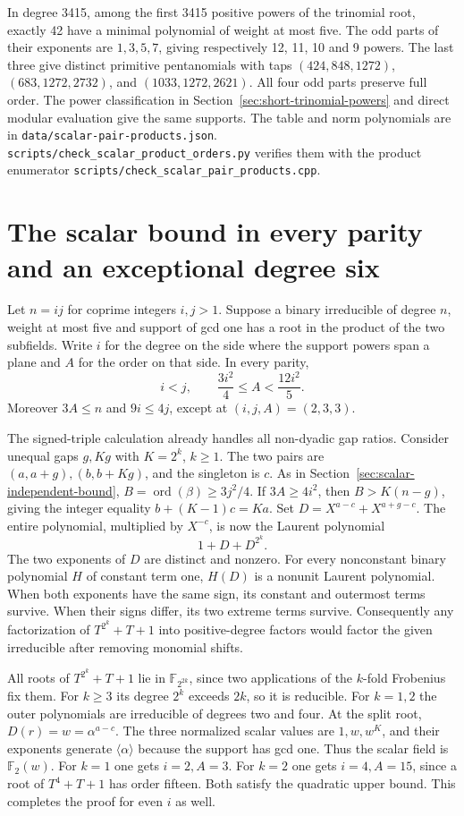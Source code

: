 \documentclass[11pt]{article}
\newcommand{\ord}{\operatorname{ord}}
\begin{document}
In degree 3415, among the first 3415 positive powers of the trinomial
root, exactly 42 have a minimal polynomial of weight at most five.
The odd parts of their exponents are \(1,3,5,7\), giving respectively
12, 11, 10 and 9 powers. The last three give distinct primitive
pentanomials with taps \((424,848,1272)\), \((683,1272,2732)\),
and \((1033,1272,2621)\). All four odd parts preserve full order.
The power classification in Section~\ref{sec:short-trinomial-powers}
and direct modular evaluation give the same supports. The table and
norm polynomials are in \nolinkurl{data/scalar-pair-products.json}.
\nolinkurl{scripts/check_scalar_product_orders.py} verifies them
with the product enumerator \nolinkurl{scripts/check_scalar_pair_products.cpp}.

\clearpage
\section{The scalar bound in every parity and an exceptional degree six}
\label{sec:scalar-all-parities}
Let \(n=ij\) for coprime integers \(i,j>1\). Suppose a binary
irreducible of degree \(n\), weight at most five and support of gcd
one has a root in the product of the two subfields. Write \(i\) for
the degree on the side where the support powers span a plane and
\(A\) for the order on that side. In every parity,
\[
        i<j,\qquad \frac{3i^2}{4}\le A<\frac{12i^2}{5}.
\]
Moreover \(3A\le n\) and \(9i\le4j\), except at \((i,j,A)=(2,3,3)\).

The signed-triple calculation already handles all non-dyadic gap
ratios. Consider unequal gaps \(g,Kg\) with \(K=2^k\), \(k\ge1\).
The two pairs are \((a,a+g),(b,b+Kg)\), and the singleton is \(c\).
As in Section~\ref{sec:scalar-independent-bound},
\(B=\ord(\beta)\ge3j^2/4\). If \(3A\ge4i^2\), then
\(B>K(n-g)\), giving the integer equality \(b+(K-1)c=Ka\).
Set \(D=X^{a-c}+X^{a+g-c}\). The entire polynomial, multiplied by
\(X^{-c}\), is now the Laurent polynomial
\[
                     1+D+D^{2^k}.
\]
The two exponents of \(D\) are distinct and nonzero. For every
nonconstant binary polynomial \(H\) of constant term one, \(H(D)\)
is a nonunit Laurent polynomial. When both exponents have the same
sign, its constant and outermost terms survive. When their signs
differ, its two extreme terms survive. Consequently any factorization
of \(T^{2^k}+T+1\) into positive-degree factors would factor the
given irreducible after removing monomial shifts.

All roots of \(T^{2^k}+T+1\) lie in \(\mathbb F_{2^{2k}}\), since
two applications of the \(k\)-fold Frobenius fix them. For \(k\ge3\)
its degree \(2^k\) exceeds \(2k\), so it is reducible.
For \(k=1,2\) the outer polynomials are irreducible of degrees
two and four. At the split root, \(D(r)=w=\alpha^{a-c}\).
The three normalized scalar values are \(1,w,w^K\), and their
exponents generate \(\langle\alpha\rangle\) because the support has
gcd one. Thus the scalar field is \(\mathbb F_2(w)\).
For \(k=1\) one gets \(i=2,A=3\). For \(k=2\) one gets
\(i=4,A=15\), since a root of \(T^4+T+1\) has order fifteen.
Both satisfy the quadratic upper bound. This completes the proof for
even \(i\) as well.
\end{document}

